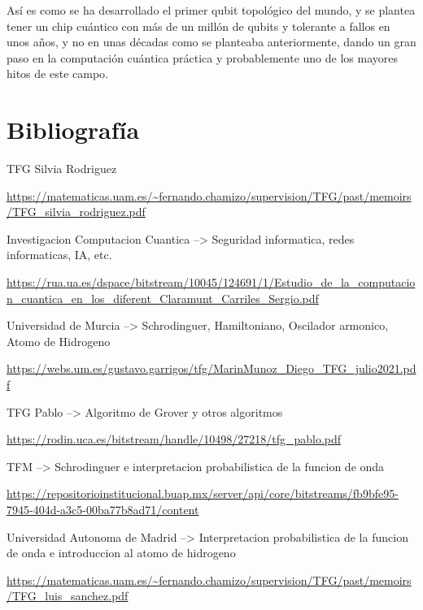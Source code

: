 \documentclass{article}
\numberwithin{equation}{section} %
\begin{document}
    Así es como se ha desarrollado el primer qubit topológico del mundo, y se plantea tener un chip cuántico con más de un millón de qubits y tolerante a fallos en unos años, y no en unas décadas como se planteaba anteriormente, dando un gran paso en la computación cuántica práctica y probablemente uno de los mayores hitos de este campo.





    \newpage
    \thispagestyle{empty}
    \mbox{}

    \section{Bibliografía}

        \vspace{5mm}

        TFG Silvia Rodriguez\par
        \url{https://matematicas.uam.es/~fernando.chamizo/supervision/TFG/past/memoirs/TFG_silvia_rodriguez.pdf}
        \vspace{2mm}

        Investigacion Computacion Cuantica --> Seguridad informatica, redes informaticas, IA, etc.\par
        \url{https://rua.ua.es/dspace/bitstream/10045/124691/1/Estudio_de_la_computacion_cuantica_en_los_diferent_Claramunt_Carriles_Sergio.pdf}
        \vspace{2mm}

        Universidad de Murcia --> Schrodinguer, Hamiltoniano, Oscilador armonico, Atomo de Hidrogeno\par
        \url{https://webs.um.es/gustavo.garrigos/tfg/MarinMunoz_Diego_TFG_julio2021.pdf}
        \vspace{2mm}

        TFG Pablo --> Algoritmo de Grover y otros algoritmos\par
        \url{https://rodin.uca.es/bitstream/handle/10498/27218/tfg_pablo.pdf}
        \vspace{2mm}

        TFM --> Schrodinguer e interpretacion probabilistica de la funcion de onda\par
        \url{https://repositorioinstitucional.buap.mx/server/api/core/bitstreams/fb9bfe95-7945-404d-a3c5-00ba77b8ad71/content}
        \vspace{2mm}

        Universidad Autonoma de Madrid --> Interpretacion probabilistica de la funcion de onda e introduccion al atomo de hidrogeno\par
        \url{https://matematicas.uam.es/~fernando.chamizo/supervision/TFG/past/memoirs/TFG_luis_sanchez.pdf}
        \vspace{2mm}
\end{document}
